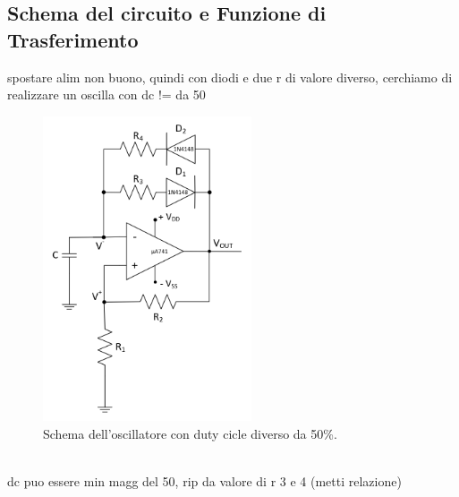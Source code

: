 \documentclass{report}
\begin{document}
\subsection{Schema del circuito e Funzione di Trasferimento}
spostare alim non buono, quindi con diodi e due r di valore diverso, cerchiamo di realizzare un oscilla con dc != da 50
\begin{figure}[h!]
	\centering
	\includegraphics[height=9cm]{immagini/schema4}
	\caption{Schema dell'oscillatore con duty cicle diverso da 50\%.}
	\label{figura:schema4}
\end{figure}
\\dc puo essere min magg del 50, rip da valore di r 3 e 4 (metti relazione)
\end{document}
